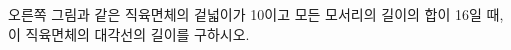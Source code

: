 \noindent\begin{minipage}[t]{0.58\linewidth}\vspace{0pt}\raggedright 오른쪽 그림과 같은 직육면체의 겉넓이가 10이고 모든 모서리의 길이의 합이 16일 때, 이 직육면체의 대각선의 길이를 구하시오.\end{minipage}\hfill\begin{minipage}[t]{0.4\linewidth}\vspace{0pt}\centering \resizebox{\ifdim\width>\linewidth\linewidth\else\width\fi}{!}{}\end{minipage}\par

